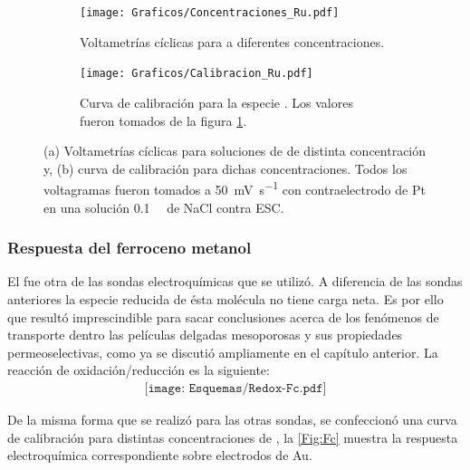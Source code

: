 {			 \begin{figure}[ht]
	 	     \begin{subfigure}[t]{0.495\textwidth}
	         	\texttt{[image: Graficos/Concentraciones\_Ru.pdf]}
	        	\caption{Voltametrías cíclicas para \ru\space a diferentes concentraciones.}
	         	\label{fig:Ru_a}
	     		\end{subfigure}
     		 \begin{subfigure}[t]{0.495\textwidth}
	        	\texttt{[image: Graficos/Calibracion\_Ru.pdf]}
	       		\caption{Curva de calibración para la especie \ru. Los valores fueron tomados de la figura \ref{fig:Ru_a}.}
	         	\label{fig:Ru_b}
	     		\end{subfigure}
	     		\label{rutenio}
	     		\caption[Respuesta electroquímica para \ru]{(a) Voltametrías cíclicas para soluciones de \ru\space de distinta concentración y, (b) curva de calibración para dichas concentraciones. Todos los voltagramas fueron tomados a \SI{50}{\milli\volt\per\second} con contraelectrodo de Pt en una solución \SI{0.1}{\milli\Molar} de NaCl contra ESC.}
	     	 \end{figure}
			 		 	 
		\subsubsection*{Respuesta del ferroceno metanol}
 	 	 
 	 	  El \fc\space fue otra de las sondas electroquímicas que se utilizó. A diferencia de las sondas anteriores la especie reducida de ésta molécula no tiene carga neta. Es por ello que resultó imprescindible para sacar conclusiones acerca de los fenómenos de transporte dentro las películas delgadas mesoporosas y sus propiedades permeoselectivas, como ya se discutió ampliamente en el capítulo anterior. La reacción de oxidación/reducción es la siguiente:
 	 				 \begin{equation}
 	 	 				\begin{aligned}
 	 	 				\texttt{[image: Esquemas/Redox-Fc.pdf]}
 	 	 				\end{aligned}
 	 	 			 \end{equation}
 	 	  
 	 	 De la misma forma que se realizó para las otras sondas, se confeccionó una curva de calibración para distintas concentraciones de \fc\space, la \ref{Fig:Fc} muestra la respuesta electroquímica correspondiente sobre electrodos de Au.
 	 				
}
